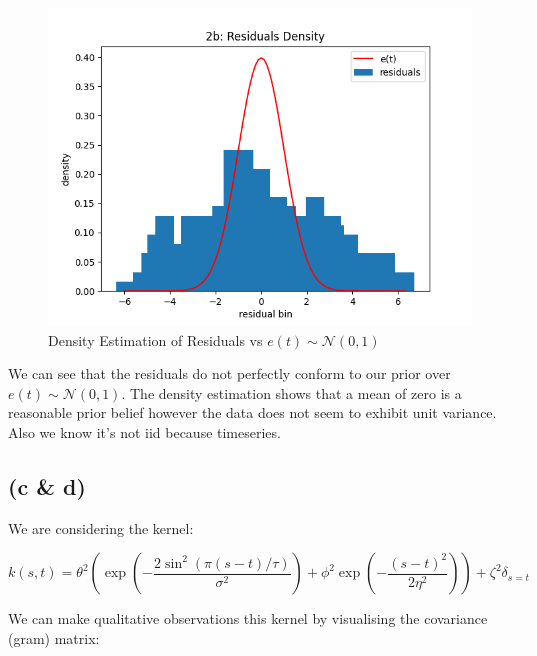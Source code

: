\documentclass[12pt]{article}
\begin{document}
\begin{figure}[h]
\centering
\includegraphics[scale=0.5]{outputs/q2/b-residuals-density-estimation}
\caption{Density Estimation of Residuals vs $e(t) \sim \mathcal{N}(0, 1)$}
\label{fig:b-residuals-density-estimation}
\end{figure}

We can see that the residuals do not perfectly conform to our prior over $e(t) \sim \mathcal{N}(0, 1)$.
The density estimation shows that a mean of zero is a reasonable prior belief however the data does not seem to exhibit unit variance.
Also we know it's not iid because timeseries.

\newpage
\subsection*{(c \& d)}

We are considering the kernel:

\[k(s, t) = \theta^2 \left( \exp\left( - \frac{2\sin^2(\pi(s-t)/\tau)}{\sigma^2}\right) + \phi^2 \exp\left( - \frac{(s-t)^2}{2\eta^2}\right)\right) + \zeta^2 \delta_{s=t}\]

We can make qualitative observations this kernel by visualising the covariance (gram) matrix:
\end{document}
